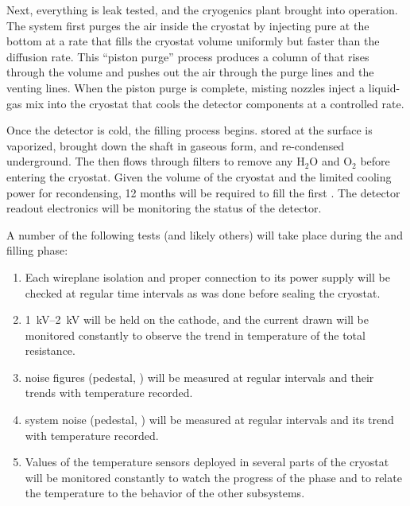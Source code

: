 Next, everything is leak tested, and the cryogenics plant brought into operation. The system first purges the air inside the cryostat  by injecting pure  at the bottom  at a rate that fills the cryostat volume uniformly but faster than the diffusion rate. This ``piston purge'' process produces a column of   that rises through the volume and pushes out the air through the  purge lines and the  venting lines.  When the piston purge is complete, misting nozzles inject a liquid-gas mix into the cryostat that cools the detector components at a controlled rate. 


Once the detector is cold, the filling process begins.  stored at the surface  
is vaporized, brought down the shaft in gaseous form, and re-condensed underground. The \lar then flows through filters to remove any H$_2$O and O$_2$ before entering the cryostat. Given the volume of the cryostat and the limited cooling power for recondensing, \num{12} months will be required to fill the first . The detector readout electronics will be  monitoring the status of the detector. 



A number of the following tests (and likely others) will  take place during the \cooldown and filling phase: 

\begin{enumerate}


    \item Each  wireplane isolation and proper connection to its  power supply will be checked at regular time intervals as was done before sealing the cryostat.
    
    \item \SIrange{1}{2}{kV} will be held on the cathode, and the current drawn will be  monitored constantly to observe the trend in temperature of the total resistance.
    
    \item {} noise figures (pedestal, ) will be measured at regular intervals and their trends with temperature recorded.
    
    \item {} system noise (pedestal, ) will be measured at regular intervals and its trend with temperature recorded.
    
     \item Values of the temperature sensors deployed in several parts of the cryostat will be monitored constantly to watch the progress of the \cooldown phase and to relate the temperature to the behavior of the other  subsystems. 
     
\end{enumerate}

